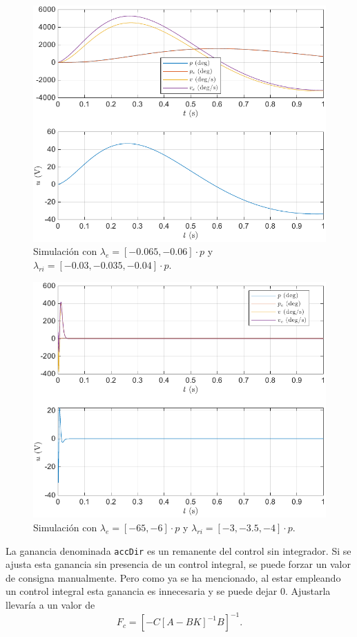 \documentclass{article}
\newcommand{\code}[1]{\colorbox{light-gray}{\texttt{#1}}}
\begin{document}
\begin{figure}[H]
    \centering
    \includegraphics[width=0.75\linewidth]{img/controlLento.pdf}
    \caption{Simulación con $\lambda_e = \left[ -0.065, -0.06 \right]\cdot p$ y $\lambda_{ri} = \left[ -0.03, -0.035, -0.04 \right]\cdot p$.}
    \label{fig:controlLento}
\end{figure}

\begin{figure}[H]
    \centering
    \includegraphics[width=0.75\linewidth]{img/controlRapido.pdf}
    \caption{Simulación con $\lambda_e = \left[ -65, -6 \right]\cdot p$ y $\lambda_{ri} = \left[ -3, -3.5, -4 \right]\cdot p$.}
    \label{fig:controlRapido}
\end{figure}

La ganancia denominada \code{accDir} es un remanente del control sin integrador. Si se ajusta esta ganancia sin presencia de un control integral, se puede forzar un valor de consigna manualmente. Pero como ya se ha mencionado, al estar empleando un control integral esta ganancia es innecesaria y se puede dejar 0. Ajustarla llevaría a un valor de
\begin{equation}
    F_c = \left[ -C\left[A-BK\right]^{-1}B \right]^{-1}.
\end{equation}
\end{document}
